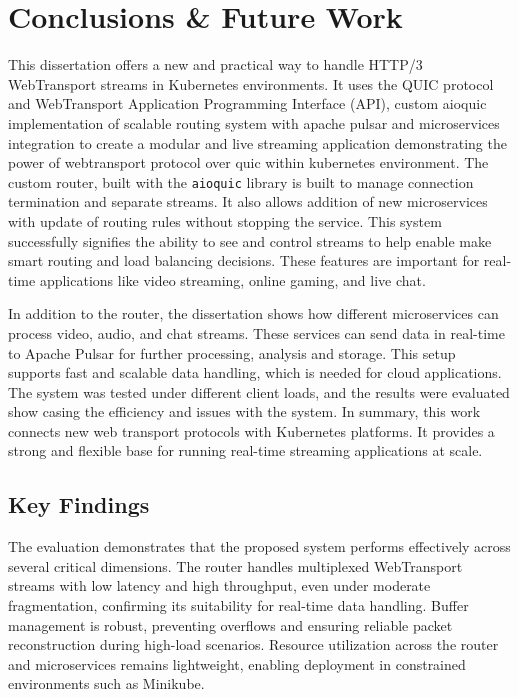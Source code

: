 
\chapter{Conclusions \& Future Work}
\label{chap:Conclusions}

This dissertation offers a new and practical way to handle HTTP/3 WebTransport streams in Kubernetes environments. It uses the QUIC protocol and WebTransport Application Programming Interface (API), custom aioquic implementation of scalable routing system with apache pulsar and microservices integration to create a modular and live streaming application demonstrating the power of webtransport protocol over quic within kubernetes environment. The custom router, built with the \texttt{aioquic} library is built to manage connection termination and separate streams. It also allows addition of new microservices with update  of routing rules without stopping the service. This system successfully signifies the ability to see and control streams to help enable make smart routing and load balancing decisions. These features are important for real-time applications like video streaming, online gaming, and live chat.

In addition to the router, the dissertation shows how different microservices can process video, audio, and chat streams. These services can send data in real-time to Apache Pulsar for further processing, analysis and storage. This setup supports fast and scalable data handling, which is needed for cloud applications. The system was tested under different client loads, and the results were evaluated show casing the efficiency and issues with the system. In summary, this work connects new web transport protocols with Kubernetes platforms. It provides a strong and flexible base for running real-time streaming applications at scale.

\section{Key Findings}

The evaluation demonstrates that the proposed system performs effectively across several critical dimensions. The router handles multiplexed WebTransport streams with low latency and high throughput, even under moderate fragmentation, confirming its suitability for real-time data handling. Buffer management is robust, preventing overflows and ensuring reliable packet reconstruction during high-load scenarios. Resource utilization across the router and microservices remains lightweight, enabling deployment in constrained environments such as Minikube.

